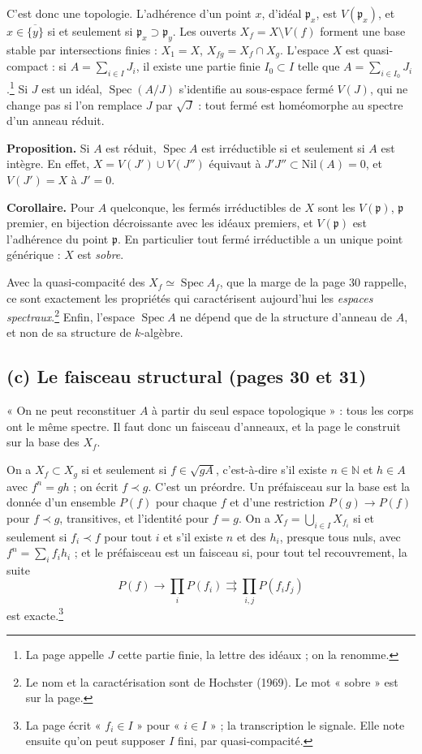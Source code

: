 \documentclass[11pt,a4paper]{article}
\begin{document}
C'est donc une topologie. L'adhérence d'un point $x$, d'idéal $\mathfrak{p}_x$,
est $V(\mathfrak{p}_x)$, et $x \in \overline{\{y\}}$ si et seulement si
$\mathfrak{p}_x \supset \mathfrak{p}_y$. Les ouverts
$X_f = X \setminus V(f)$ forment une base stable par intersections finies :
$X_1 = X$, $X_{fg} = X_f \cap X_g$. L'espace $X$ est quasi-compact : si
$A = \sum_{i \in I} J_i$, il existe une partie finie $I_0 \subset I$ telle que
$A = \sum_{i \in I_0} J_i$.\footnote{La page appelle $J$ cette partie finie, la
lettre des idéaux ; on la renomme.} Si $J$ est un idéal,
$\operatorname{Spec}(A/J)$ s'identifie au sous-espace fermé $V(J)$, qui ne
change pas si l'on remplace $J$ par $\sqrt{J}$ : tout fermé est homéomorphe au
spectre d'un anneau réduit.

\textbf{Proposition.} Si $A$ est réduit, $\operatorname{Spec} A$ est
irréductible si et seulement si $A$ est intègre. En effet, $X = V(J') \cup V(J'')$
équivaut à $J'J'' \subset \mathrm{Nil}(A) = 0$, et $V(J') = X$ à $J' = 0$.

\textbf{Corollaire.} Pour $A$ quelconque, les fermés irréductibles de $X$ sont
les $V(\mathfrak{p})$, $\mathfrak{p}$ premier, en bijection décroissante avec
les idéaux premiers, et $V(\mathfrak{p})$ est l'adhérence du point
$\mathfrak{p}$. En particulier tout fermé irréductible a un unique point
générique : $X$ est \emph{sobre}.

Avec la quasi-compacité des $X_f \simeq \operatorname{Spec} A_f$, que la marge de
la page 30 rappelle, ce sont exactement les propriétés qui caractérisent
aujourd'hui les \emph{espaces spectraux}.\footnote{Le nom et la caractérisation
sont de Hochster (1969). Le mot « sobre » est sur la page.} Enfin, l'espace
$\operatorname{Spec} A$ ne dépend que de la structure d'anneau de $A$, et non de
sa structure de $k$-algèbre.

\subsection*{(c) Le faisceau structural (pages 30 et 31)}

« On ne peut reconstituer $A$ à partir du seul espace topologique » : tous les
corps ont le même spectre. Il faut donc un faisceau d'anneaux, et la page le
construit sur la base des $X_f$.

On a $X_f \subset X_g$ si et seulement si $f \in \sqrt{gA}$, c'est-à-dire s'il
existe $n \in \mathbb{N}$ et $h \in A$ avec $f^n = gh$ ; on écrit $f \prec g$.
C'est un préordre. Un préfaisceau sur la base est la donnée d'un ensemble
$P(f)$ pour chaque $f$ et d'une restriction $P(g) \to P(f)$ pour $f \prec g$,
transitives, et l'identité pour $f = g$. On a $X_f = \bigcup_{i \in I} X_{f_i}$
si et seulement si $f_i \prec f$ pour tout $i$ et s'il existe $n$ et des
$h_i$, presque tous nuls, avec $f^n = \sum_i f_i h_i$ ; et le préfaisceau est
un faisceau si, pour tout tel recouvrement, la suite
\[
P(f) \longrightarrow \prod_i P(f_i) \rightrightarrows \prod_{i,j} P(f_i f_j)
\]
est exacte.\footnote{La page écrit « $f_i \in I$ » pour « $i \in I$ » ; la
transcription le signale. Elle note ensuite qu'on peut supposer $I$ fini, par
quasi-compacité.}
\end{document}
